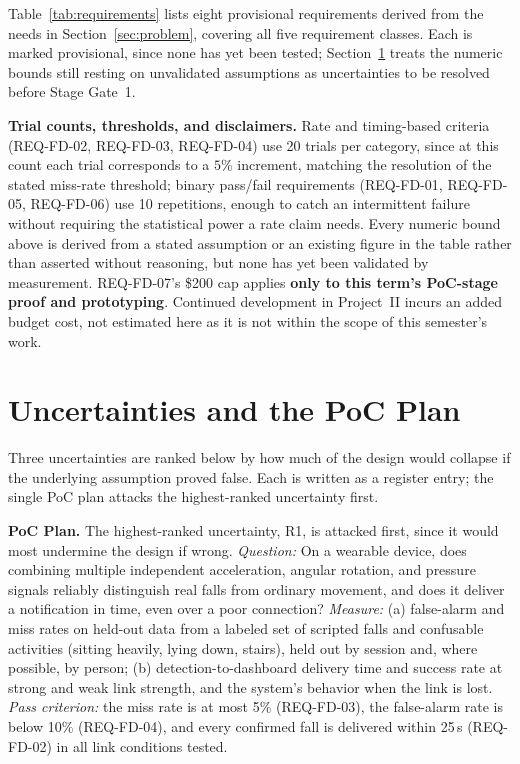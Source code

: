 \documentclass[conference,onecolumn]{IEEEtran}
\begin{document}
Table~\ref{tab:requirements} lists eight provisional requirements derived from the needs in Section~\ref{sec:problem}, covering all five requirement classes. Each is marked provisional, since none has yet been tested; Section~\ref{sec:uncertainties} treats the numeric bounds still resting on unvalidated assumptions as uncertainties to be resolved before Stage Gate~1.



\textbf{Trial counts, thresholds, and disclaimers.} Rate and timing-based criteria (REQ-FD-02, REQ-FD-03, REQ-FD-04) use 20 trials per category, since at this count each trial corresponds to a $5\%$ increment, matching the resolution of the stated miss-rate threshold; binary pass/fail requirements (REQ-FD-01, REQ-FD-05, REQ-FD-06) use 10 repetitions, enough to catch an intermittent failure without requiring the statistical power a rate claim needs. Every numeric bound above is derived from a stated assumption or an existing figure in the table rather than asserted without reasoning, but none has yet been validated by measurement.  REQ-FD-07's \$200 cap applies \textbf{only to this term's PoC-stage proof and prototyping}.  Continued development in Project~II incurs an added budget cost, not estimated here as it is not within the scope of this semester's work.

\section{Uncertainties and the PoC Plan}
\label{sec:uncertainties}

Three uncertainties are ranked below by how much of the design would collapse if the underlying assumption proved false.  Each is written as a register entry; the single PoC plan attacks the highest-ranked uncertainty first.

\textbf{PoC Plan.} The highest-ranked uncertainty, R1, is attacked first, since it would most undermine the design if wrong. \emph{Question:} On a wearable device, does combining multiple independent acceleration, angular rotation, and pressure signals reliably distinguish real falls from ordinary movement, and does it deliver a notification in time, even over a poor connection? \emph{Measure:} (a) false-alarm and miss rates on held-out data from a labeled set of scripted falls and confusable activities (sitting heavily, lying down, stairs), held out by session and, where possible, by person; (b) detection-to-dashboard delivery time and success rate at strong and weak link strength, and the system's behavior when the link is lost. \emph{Pass criterion:} the miss rate is at most 5\% (REQ-FD-03), the false-alarm rate is below 10\% (REQ-FD-04), and every confirmed fall is delivered within 25\,s (REQ-FD-02) in all link conditions tested.
\end{document}
